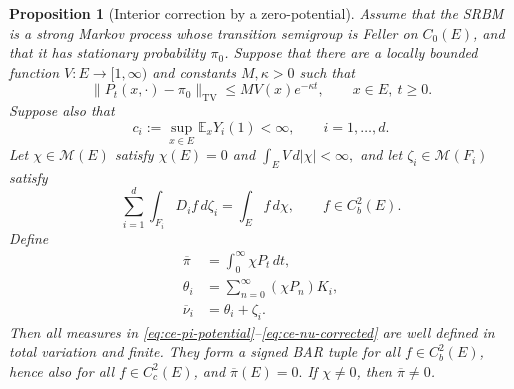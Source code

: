 \documentclass[aihp]{imsart}
\numberwithin{equation}{section}
\theoremstyle{plain}
\newtheorem{proposition}[proposition]{Proposition}
\theoremstyle{definition}
\newcommand{\cM}{\mathcal M}
\newcommand{\TV}{\mathrm{TV}}
\newcommand{\1}{\mathbf 1}
\begin{document}
\begin{proposition}[Interior correction by a zero-potential]\label{prop:zero-potential-correction}
Assume that the SRBM is a strong Markov process whose transition semigroup is Feller on $C_0(E)$, and that it has stationary probability $\pi_0$. Suppose that there are a locally bounded function $V:E\to[1,\infty)$ and constants $M,\kappa>0$ such that
\begin{equation}\label{eq:ce-ergodicity}
 \|P_t(x,\cdot)-\pi_0\|_{\TV}
 \le M V(x)e^{-\kappa t},
 \qquad x\in E,\ t\ge0.
\end{equation}
Suppose also that
\begin{equation}\label{eq:ce-regulator-bound}
 c_i:=\sup_{x\in E}\mathbb E_xY_i(1)<\infty,
 \qquad i=1,\ldots,d.
\end{equation}
Let $\chi\in\cM(E)$ satisfy $\chi(E)=0$ and $\int_E V\,d|\chi|<\infty,$ and let $\zeta_i\in\cM(F_i)$ satisfy
\begin{equation}\label{eq:ce-boundary-source}
 \sum_{i=1}^d\int_{F_i}D_i f\,d\zeta_i
 =\int_E f\,d\chi,
 \qquad f\in C_b^2(E).
\end{equation}
Define
\begin{align}
 \overline\pi&=\int_0^\infty \chi P_t\,dt,
                                                    \label{eq:ce-pi-potential}\\
 \theta_i&=\sum_{n=0}^\infty(\chi P_n)K_i,
                                                    \label{eq:ce-theta-potential}\\
 \overline\nu_i&=\theta_i+\zeta_i.              \label{eq:ce-nu-corrected}
\end{align}
Then all measures in \eqref{eq:ce-pi-potential}--\eqref{eq:ce-nu-corrected} are well defined in total variation and finite. They form a signed BAR tuple for all $f\in C_b^2(E)$, hence also for all $f\in C_c^2(E)$, and $\overline\pi(E)=0.$ If $\chi\ne0$, then $\overline\pi\ne0$.
\end{proposition}
\end{document}
